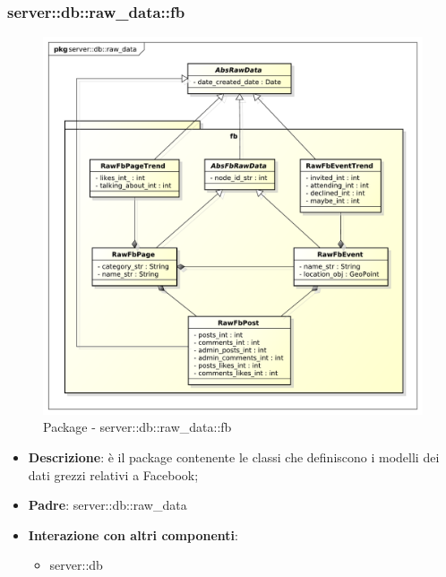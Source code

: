 		\subsubsection{server::db::raw\_data::fb} %
		\label{ssub:bdsm_app_server_db_raw_data_fb}
		\begin{figure}[htbp]
			\centering
			\centerline{\includegraphics[scale=0.5]{./images/server/raw_data_fb.pdf}}
			\caption{Package - server::db::raw\_data::fb}
		\end{figure}
		\begin{itemize}
		  \item \textbf{Descrizione}:  è il package contenente le classi che definiscono i modelli dei dati grezzi relativi a Facebook;
		  \item \textbf{Padre}: server::db::raw\_data
		  \item \textbf{Interazione con altri componenti}:
		  	\begin{itemize}
		  		\item server::db
			\end{itemize}
		\end{itemize}

